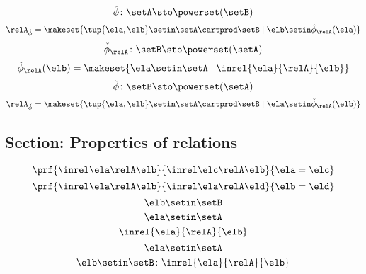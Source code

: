 \begin{forslides}
\begin{equation}
    \end{equation}
    \begin{equation}\label{eq:slides_session2_120}
        \hat \phi \colon \setA \sto \powerset (\setB)
    \end{equation}
    \begin{equation}\label{eq:slides_session2_121}
        \relA_{\hat \phi} = \makeset{ \tup{\ela, \elb} \setin \setA \cartprod \setB \mid \elb \setin \hat \phi_{\relA}(\ela)   }
    \end{equation}
    \begin{equation}\label{eq:slides_session2_122}
        \check \phi_{\relA} \colon \setB \sto \powerset (\setA)
    \end{equation}
    \begin{equation}\label{eq:slides_session2_123}
        \check \phi_{\relA} (\elb) = \makeset{ \ela \setin \setA \mid \inrel{\ela}{\relA}{\elb}}
    \end{equation}
    \begin{equation}\label{eq:slides_session2_124}
        \check \phi \colon \setB \sto \powerset (\setA)
    \end{equation}
    \begin{equation}\label{eq:slides_session2_125}
        \relA_{\check \phi} = \makeset{ \tup{\ela, \elb} \setin \setA \cartprod \setB \mid \ela \setin \check \phi_{\relA}(\elb)}
    \end{equation}

    \subsection{Section: Properties of relations}

    \begin{equation}\label{eq:slides_session2_126}
        \prf{
            \inrel \ela \relA \elb
        }{
            \inrel \elc \relA \elb
        }{
            \ela=\elc
        }
    \end{equation}
    \begin{equation}\label{eq:slides_session2_127}
        \prf{
            \inrel \ela \relA \elb
        }{
            \inrel \ela \relA \eld
        }{
            \elb = \eld
        }
    \end{equation}
    \begin{equation}\label{eq:slides_session2_128}
        \elb\setin \setB
    \end{equation}
    \begin{equation}\label{eq:slides_session2_129}
        \ela\setin \setA
    \end{equation}
    \begin{equation}\label{eq:slides_session2_130}
        \inrel{\ela}{\relA}{\elb}
    \end{equation}
    \begin{equation}\label{eq:slides_session2_131}
        \ela\setin \setA
    \end{equation}
    \begin{equation}\label{eq:slides_session2_132}
        \elb \setin \setB\colon \inrel{\ela}{\relA}{\elb}
    \end{equation}


\end{forslides}

